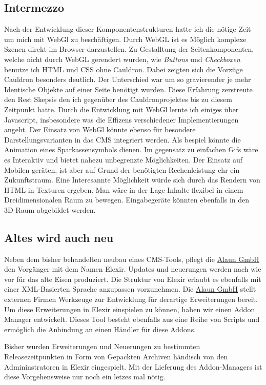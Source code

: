 \documentclass[12pt]{article}
\begin{document}
\subsection{Intermezzo}

Nach der Entwicklung dieser Komponentenstrukturen hatte ich die nötige Zeit um mich mit WebGl zu beschäftigen. Durch WebGL ist es Möglich
komplexe Szenen direkt im Browser darzustellen. Zu Gestalltung der Seitenkomponenten, welche nicht durch WebGL gerendert wurden, wie \textit{Buttons}
und \textit{Checkboxen} benutze ich HTML und CSS ohne Cauldron. Dabei zeigten sich die Vorzüge Cauldron besonders deutlich.
Der Unterschied war um so gravierender je mehr Identische Objekte auf einer Seite benötigt wurden. Diese Erfahrung zerstreute den Rest Skepsis
den ich gegenüber des Cauldronprojektes bis zu diesem Zeitpunkt hatte. Durch die Entwicklung mit WebGl lernte ich einiges über Javascript,
insbesondere was die Effizens verschiedener Implementierungen angeht. Der Einsatz von WebGl könnte ebenso für besondere Darstellungsvarianten
in das CMS integriert werden. Als bespiel könnte die Animation eines Sparkassensymbols dienen. Im gegensatz zu einfachen Gifs wäre es Interaktiv
und bietet nahezu unbegrenzte Möglichkeiten. Der Einsatz auf Mobilen geräten, ist aber auf Grund der benötigten Rechenleistung ehr ein
Zukunftstraum. Eine Interesannte Möglichkeit würde sich durch das Rendern von HTML in Texturen ergeben. Man wäre in der Lage Inhalte flexibel in
einem Dreidimensionalen Raum zu bewegen. Eingabegeräte könnten ebenfalls in den 3D-Raum abgebildet werden.

\subsection{Altes wird auch neu}

Neben dem bisher behandelten neubau eines CMS-Tools, pflegt die \href{https://alaun.de/home/}{Alaun GmbH} den Vorgänger mit dem Namen Elexir.
Updates und neuerungen werden nach wie vor für das alte Eisen produziert. Die Struktur von Elexir erlaubt es ebenfalls mit einer XML-Basierten
Sprache anzupassen vorzunehmen. Die \href{https://alaun.de/home/}{Alaun GmbH} stellt externen Firmen Werkzeuge zur Entwicklung für derartige
Erweiterungen bereit. Um diese Erweiterungen in Elexir einspielen zu können, haben wir einen Addon Manager entwickelt. Dieses Tool besteht
ebenfalls aus eine Reihe von Scripts und ermöglich die Anbindung an einen Händler für diese Addons.

Bisher wurden Erweiterungen und Neuerungen zu bestimmten Releasezeitpunkten in Form von Gepackten Archiven händisch von den Admininstratoren
in Elexir eingespielt. Mit der Lieferung des Addon-Managers ist diese Vorgehensweise nur noch ein letzes mal nötig.
\end{document}
